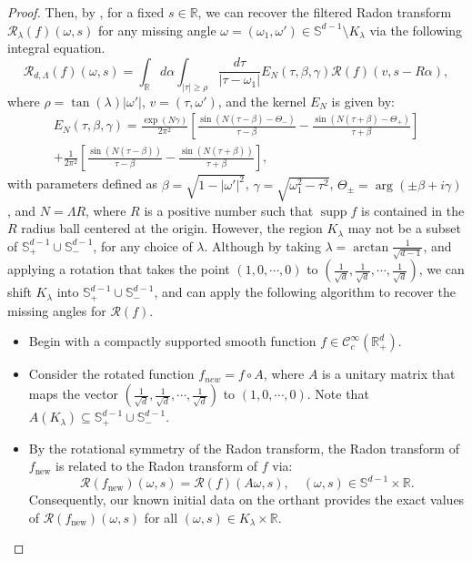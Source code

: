 \documentclass[11pt,reqno]{amsart}
\theoremstyle{plain}
\theoremstyle{definition}
\numberwithin{equation}{section}
\newcommand{\R}{\mathbb{R}}
\newcommand{\ltt}{\left(}
\newcommand{\rtt}{\right)}
\newcommand{\bea} {\begin{eqnarray}}
\newcommand{\eea} {\end{eqnarray}}
\begin{document}
\begin{proof}
Then, by \cite[Theorem~2]{PD88}, for a fixed $s\in\R$, we can recover the filtered Radon transform $\mathcal R_\lambda(f)(\omega,s)$ for any missing angle $\omega=(\omega_1, \omega')\in \mathbb S^{d-1}\setminus K_\lambda$ via the following integral equation.
\[
\mathcal R_{d,\Lambda}(f)(\omega,s)=\int_{\R} d\alpha \int_{|\tau|\geq \rho} \frac{d\tau}{|\tau-\omega_1|} E_N(\tau,\beta,\gamma) \mathcal R(f)(v,s-R\alpha),
\]
where $\rho = \tan(\lambda)|\omega'|$, $v=(\tau,\omega')$, and the kernel $E_N$ is given by:
\bea\label{eq:P-D transform}
\nonumber E_N(\tau,\beta,\gamma) = \frac{\exp(N\gamma)}{2\pi^2} \left[ \frac{\sin(N(\tau-\beta)-\Theta_-)}{\tau-\beta} - \frac{\sin(N(\tau+\beta)-\Theta_+)}{\tau+\beta} \right]\\  
+\frac{1}{2\pi^2} \left[ \frac{\sin(N(\tau-\beta))}{\tau-\beta} - \frac{\sin(N(\tau+\beta))}{\tau+\beta} \right],
\eea
with parameters defined as $\beta = \sqrt{1-|\omega'|^2}$, $\gamma = \sqrt{\omega_1^2 - \tau^2}$, $\Theta_\pm = \arg(\pm \beta + i\gamma)$, and $N=\Lambda R$, where $R$ is a positive number such that $\operatorname{supp} f $ is contained in the $R$ radius ball centered at the origin.
However, the region $K_\lambda$ may not be a subset of $\mathbb S^{d-1}_+ \cup \mathbb S_{-}^{d-1}$, for any choice of $\lambda$. Although by taking $\lambda=\arctan\frac{1}{\sqrt{d-1}}$, and applying a rotation that takes the point $(1,0,\cdots,0)$ to $\ltt\frac{1}{\sqrt d},\frac{1}{\sqrt d},\cdots,\frac{1}{\sqrt d}\rtt$, we can shift $K_\lambda$ into $\mathbb S^{d-1}_+ \cup \mathbb S^{d-1}_-$, and can apply the following algorithm to recover the missing angles for $\mathcal R(f)$.
    \begin{itemize}
        \item [(i)] Begin with a compactly supported smooth function $f\in \mathcal C^\infty_c(\R^d_+)$.
        \item[(ii)] Consider the rotated function $f_{new}=f\circ A$, where $A$ is a unitary matrix that maps the vector $\ltt\frac{1}{\sqrt d},\frac{1}{\sqrt d},\cdots,\frac{1}{\sqrt d}\rtt$ to $(1,0,\cdots,0)$. Note that $A(K_{\lambda})\subseteq \mathbb S_+^{d-1}\cup \mathbb S^{d-1}_{-}$.
        \item[(iii)] By the rotational symmetry of the Radon transform, the Radon transform of $f_{\text{new}}$ is related to the Radon transform of $f$ via:
    \[
    \mathcal R(f_{\text{new}})(\omega,s) = \mathcal R(f)(A\omega,s),\quad (\omega,s)\in \mathbb S^{d-1}\times \R.
    \]
    Consequently, our known initial data on the orthant provides the exact values of $\mathcal R(f_{\text{new}})(\omega,s)$ for all $(\omega,s) \in K_\lambda \times \R$.

\end{itemize}
\end{proof}
\end{document}
